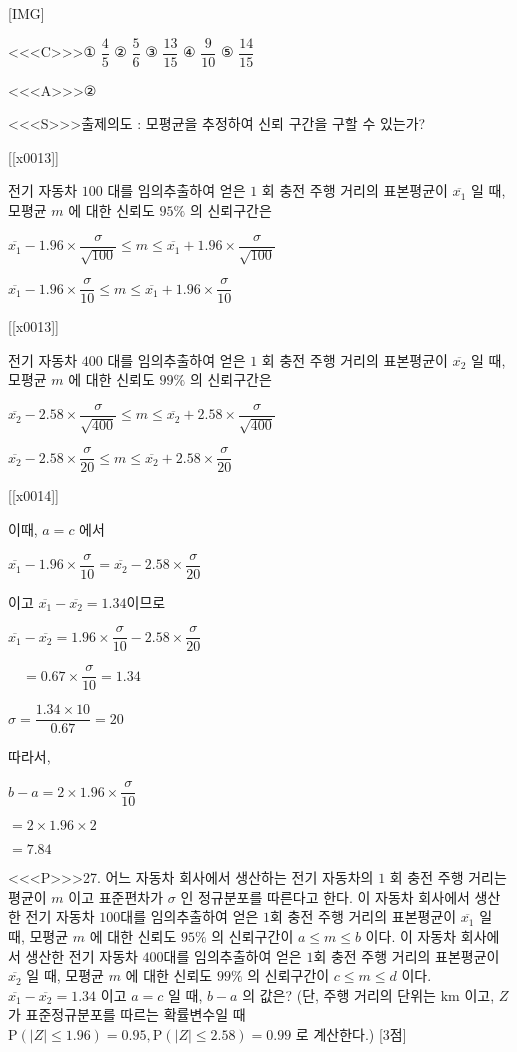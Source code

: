 \documentclass{oblivoir}
\begin{document}
[IMG]

<<<C>>>① $\dfrac{4}{5}$
② $\dfrac{5}{6}$
③ $\dfrac{13}{15}$
④ $\dfrac{9}{10}$
⑤ $\dfrac{14}{15}$


<<<A>>>②

<<<S>>>출제의도 : 모평균을 추정하여 신뢰 구간을 구할 수 있는가?

[[x0013]]

전기 자동차 $100$ 대를 임의추출하여 얻은 $1$ 회 충전 주행 거리의 표본평균이 $\overline{x_{1}}$ 일 때, 모평균 $m$ 에 대한 신뢰도 $95 \%$ 의 신뢰구간은

$\overline{x_{1}}-1.96 \times \dfrac{\sigma}{\sqrt{100}} \leq m \leq \overline{x_{1}}+1.96 \times \dfrac{\sigma}{\sqrt{100}}$

$\overline{x_{1}}-1.96 \times \dfrac{\sigma}{10} \leq m \leq \overline{x_{1}}+1.96 \times \dfrac{\sigma}{10}$

[[x0013]]

전기 자동차 $400$ 대를 임의추출하여 얻은 $1$ 회 충전 주행 거리의 표본평균이 $\overline{x_{2}}$ 일 때, 모평균 $m$ 에 대한 신뢰도 $99 \%$ 의 신뢰구간은

$\overline{x_{2}}-2.58 \times \dfrac{\sigma}{\sqrt{400}} \leq m \leq \overline{x_{2}}+2.58 \times \dfrac{\sigma}{\sqrt{400}}$

$\overline{x_{2}}-2.58 \times \dfrac{\sigma}{20} \leq m \leq \overline{x_{2}}+2.58 \times \dfrac{\sigma}{20}$

[[x0014]]

이때, $a=c$ 에서

$\overline{x_{1}}-1.96 \times \dfrac{\sigma}{10}=\overline{x_{2}}-2.58 \times \dfrac{\sigma}{20}$

이고 $\overline{x_{1}}-\overline{x_{2}}=1.34$이므로

$\overline{x_{1}}-\overline{x_{2}}=1.96 \times \dfrac{\sigma}{10}-2.58 \times \dfrac{\sigma}{20}$

$\quad=0.67 \times \dfrac{\sigma}{10}=1.34$

$\sigma=\dfrac{1.34 \times 10}{0.67}=20$

따라서,

$b-a=2 \times 1.96 \times \dfrac{\sigma}{10}$

$=2 \times 1.96 \times 2$

$=7.84$


<<<P>>>27. 어느 자동차 회사에서 생산하는 전기 자동차의 $1$ 회 충전 주행 거리는 평균이 $m$ 이고 표준편차가 $\sigma$ 인 정규분포를 따른다고 한다. 이 자동차 회사에서 생산한 전기 자동차 $100$대를 임의추출하여 얻은 $1$회 충전 주행 거리의 표본평균이 $\overline{x_{1}}$ 일 때, 모평균 $m$ 에 대한 신뢰도 $95 \%$ 의 신뢰구간이 $a \leq m \leq b$ 이다. 이 자동차 회사에서 생산한 전기 자동차 $400$대를 임의추출하여 얻은 $1$회 충전 주행 거리의 표본평균이 $\overline{x_{2}}$ 일 때, 모평균 $m$ 에 대한 신뢰도 $99 \%$ 의 신뢰구간이 $c \leq m \leq d$ 이다. $\overline{x_{1}}-\overline{x_{2}}=1.34$ 이고 $a=c$ 일 때, $b-a$ 의 값은? (단, 주행 거리의 단위는 $\mathrm{km}$ 이고, $Z$ 가 표준정규분포를 따르는 확률변수일 때 $\mathrm{P}(|Z| \leq 1.96)=0.95, \mathrm{P}(|Z| \leq 2.58)=0.99$ 로 계산한다.) [3점]
\end{document}
